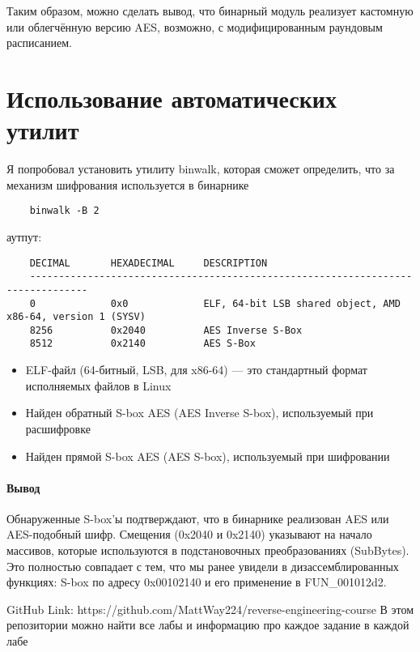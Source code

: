     Таким образом, можно сделать вывод, что бинарный модуль реализует кастомную или облегчённую версию AES, возможно, с модифицированным раундовым расписанием.


    \section{Использование автоматических утилит}
    Я попробовал установить утилиту binwalk, которая сможет определить, что за механизм шифрования используется в бинарнике

    \begin{verbatim}
    binwalk -B 2
    \end{verbatim}

    аутпут:
    \begin{verbatim}
    DECIMAL       HEXADECIMAL     DESCRIPTION
    --------------------------------------------------------------------------------
    0             0x0             ELF, 64-bit LSB shared object, AMD x86-64, version 1 (SYSV)
    8256          0x2040          AES Inverse S-Box
    8512          0x2140          AES S-Box
    \end{verbatim}

    \begin{itemize}
        \item ELF-файл (64-битный, LSB, для x86-64) — это стандартный формат исполняемых файлов в Linux
        \item Найден обратный S-box AES (AES Inverse S-box), используемый при расшифровке
        \item Найден прямой S-box AES (AES S-box), используемый при шифровании
    \end{itemize}

    \paragraph{Вывод}
    Обнаруженные S-box'ы подтверждают, что в бинарнике реализован AES или AES-подобный шифр.
    Смещения (0x2040 и 0x2140) указывают на начало массивов, которые используются в подстановочных преобразованиях (SubBytes). Это полностью совпадает с тем, что мы ранее увидели в дизассемблированных функциях: S-box по адресу 0x00102140 и его применение в FUN\_001012d2.


    \begin{thebibliography}{1}
        GitHub Link: https://github.com/MattWay224/reverse-engineering-course
        В этом репозитории можно найти все лабы и информацию про каждое задание в каждой лабе
    \end{thebibliography}

